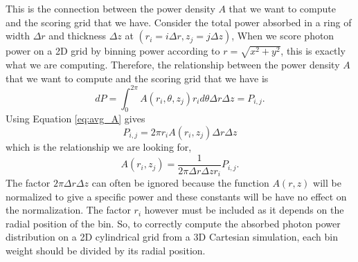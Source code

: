 \documentclass[letterpaper,12pt]{article}
\begin{document}
This is the connection between the power density $A$ that we want
to compute and the scoring grid that we have.  Consider the total power
absorbed in a ring of width $\Delta r$ and thickness $\Delta z$ at $(r_i =
i\Delta r, z_j = j\Delta z)$, When we score photon power on a 2D grid by binning
power according to $r = \sqrt{x^2 + y^2}$, this is exactly what we are
computing.  Therefore, the relationship between the power density $A$
that we want to compute and the scoring grid that we have is
\begin{equation}
  dP = \int_{0}^{2\pi}
       A( r_i, \theta, z_j)
       r_i d\theta
       \Delta r
       \Delta z = P_{i,j}.
\end{equation}
Using Equation \ref{eq:avg_A} gives
\begin{equation}
       P_{i,j} =
       2\pi r_i A(r_i,z_j)
       \Delta r
       \Delta z
\end{equation}
which is the relationship we are looking for,
\begin{equation}
  A(r_i,z_j) = \frac{1}{2\pi \Delta r \Delta z r_i } P_{i,j}.
\end{equation}
The factor $2\pi\Delta r \Delta z$ can often be ignored because the function $A(r,z)$ will be normalized to give a specific power and these constants will be have no effect on the normalization. The
factor $r_i$ however must be included as it depends on the radial position of the bin. So, to correctly compute the absorbed photon power distribution on a 2D cylindrical grid from a 3D Cartesian simulation,
each bin weight should be divided by its radial position.
\end{document}
